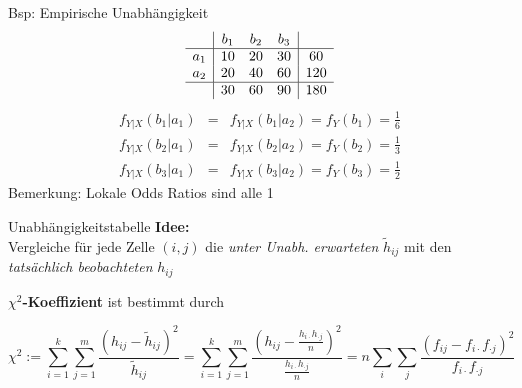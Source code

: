 \documentclass[
  10pt,
  ignorenonframetext,
]{beamer}
\begin{document}
\begin{frame}{Bsp: Empirische Unabhängigkeit}
\protect\hypertarget{bsp-empirische-unabhuxe4ngigkeit}{}
\begin{displaymath}
\begin{array}{c|ccc|c}
 &      b_1 & b_2 & b_3 & \\\hline
 a_1 &  10 & 20 & 30 & 60 \\
 a_2 &  20 & 40 & 60 & 120 \\
 \hline
  &     30 & 60 & 90 & 180
\end{array}
\end{displaymath} \begin{eqnarray*}
f_{Y|X}(b_1|a_1) &=& f_{Y|X}(b_1|a_2) = f_Y(b_1) = \frac{1}{6} \\
f_{Y|X}(b_2|a_1) &=& f_{Y|X}(b_2|a_2) = f_Y(b_2) = \frac{1}{3} \\
f_{Y|X}(b_3|a_1) &=& f_{Y|X}(b_3|a_2) = f_Y(b_3) = \frac{1}{2}
\end{eqnarray*} Bemerkung: Lokale Odds Ratios sind alle 1
\end{frame}


\begin{frame}{Unabhängigkeitstabelle}
\protect\hypertarget{unabhuxe4ngigkeitstabelle}{}
\textbf{Idee:}\\
Vergleiche für jede Zelle \((i,j)\) die \emph{unter Unabh. erwarteten}
\(\tilde{h}_{ij}\) mit den \emph{tatsächlich beobachteten} \(h_{ij}\)

\(\chi^2\)\textbf{-Koeffizient} ist bestimmt durch

\begin{displaymath}
\chi^2 := \sum_{i=1}^k\sum_{j=1}^m
\frac{\left(h_{ij}-\tilde h_{ij}\right)^2}
{\tilde h_{ij}} =
\sum_{i=1}^k\sum_{j=1}^m
\frac{\left(h_{ij}-\frac{h_{i\cdot}h_{\cdot j}}{n}\right)^2}
{\frac{h_{i\cdot}h_{\cdot j}}{n}} = n\sum_{i}\sum_{j}\frac{(f_{ij}-f_{i\cdot}f_{\cdot j})^2}{f_{i\cdot}f_{\cdot j}}
\end{displaymath}
\end{frame}
\end{document}

